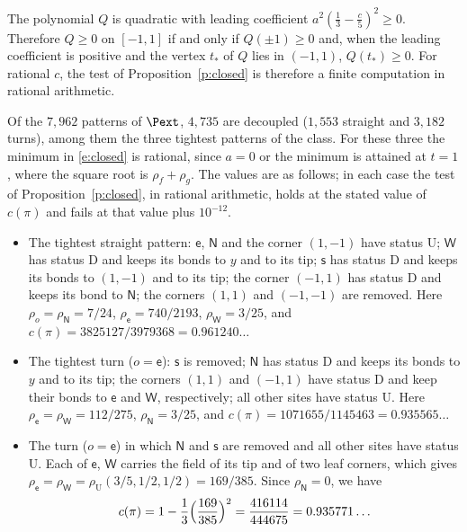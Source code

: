 The polynomial $Q$ is quadratic with leading coefficient $a^2 (\frac13 - \frac c5)^2 \ge 0$. Therefore $Q \ge 0$ on $[-1, 1]$ if and only if $Q(\pm 1) \ge 0$ and, when the leading coefficient is positive and the vertex $t_*$ of $Q$ lies in $(-1, 1)$, $Q(t_*) \ge 0$. For rational $c$, the test of Proposition~\ref{p:closed} is therefore a finite computation in rational arithmetic.

Of the $7{,}962$ patterns of $\Pext$, $4{,}735$ are decoupled ($1{,}553$ straight and $3{,}182$ turns), among them the three tightest patterns of the class. For these three the minimum in \eqref{e:closed} is rational, since $a = 0$ or the minimum is attained at $t = 1$, where the square root is $\rho_f + \rho_g$. The values are as follows; in each case the test of Proposition~\ref{p:closed}, in rational arithmetic, holds at the stated value of $c(\pi)$ and fails at that value plus $10^{-12}$.
\begin{itemize}
\item The tightest straight pattern: $\mathsf e$, $\mathsf N$ and the corner $(1, -1)$ have status $\mathrm U$; $\mathsf W$ has status $\mathrm D$ and keeps its bonds to $y$ and to its tip; $\mathsf s$ has status $\mathrm D$ and keeps its bonds to $(1, -1)$ and to its tip; the corner $(-1, 1)$ has status $\mathrm D$ and keeps its bond to $\mathsf N$; the corners $(1, 1)$ and $(-1, -1)$ are removed. Here $\rho_o = \rho_{\mathsf N} = 7/24$, $\rho_{\mathsf e} = 740/2193$, $\rho_{\mathsf W} = 3/25$, and $c(\pi) = 3825127/3979368 = 0.961240\ldots$
\item The tightest turn ($o = \mathsf e$): $\mathsf s$ is removed; $\mathsf N$ has status $\mathrm D$ and keeps its bonds to $y$ and to its tip; the corners $(1, 1)$ and $(-1, 1)$ have status $\mathrm D$ and keep their bonds to $\mathsf e$ and $\mathsf W$, respectively; all other sites have status $\mathrm U$. Here $\rho_{\mathsf e} = \rho_{\mathsf W} = 112/275$, $\rho_{\mathsf N} = 3/25$, and $c(\pi) = 1071655/1145463 = 0.935565\ldots$
\item The turn ($o = \mathsf e$) in which $\mathsf N$ and $\mathsf s$ are removed and all other sites have status $\mathrm U$. Each of $\mathsf e$, $\mathsf W$ carries the field of its tip and of two leaf corners, which gives $\rho_{\mathsf e} = \rho_{\mathsf W} = \rho_{\mathrm U}(3/5, 1/2, 1/2) = 169/385$. Since $\rho_{\mathsf N} = 0$, we have
\begin{equation}\label{e:5469}
c(\pi) = 1 - \frac13 \Bigl( \frac{169}{385} \Bigr)^2 = \frac{416114}{444675} = 0.935771\ldots
\end{equation}
\end{itemize}


